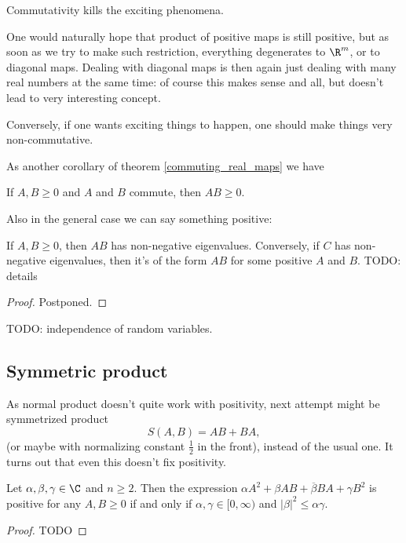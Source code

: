 \begin{phil}
	Commutativity kills the exciting phenomena.
\end{phil}

One would naturally hope that product of positive maps is still positive, but as soon as we try to make such restriction, everything degenerates to $\R^{m}$, or to diagonal maps. Dealing with diagonal maps is then again just dealing with many real numbers at the same time: of course this makes sense and all, but doesn't lead to very interesting concept.

Conversely, if one wants exciting things to happen, one should make things very non-commutative.

As another corollary of theorem \ref{commuting_real_maps} we have

\begin{kor}
	If $A, B \geq 0$ and $A$ and $B$ commute, then $AB \geq 0$.
\end{kor}

Also in the general case we can say something positive:

\begin{prop}
	If $A, B \geq 0$, then $AB$ has non-negative eigenvalues. Conversely, if $C$ has non-negative eigenvalues, then it's of the form $AB$ for some positive $A$ and $B$. TODO: details
\end{prop}
\begin{proof}
	Postponed.
\end{proof}

TODO: independence of random variables.

\subsection{Symmetric product}

As normal product doesn't quite work with positivity, next attempt might be symmetrized product
\[
	S(A, B) = AB + BA,
\]
(or maybe with normalizing constant $\frac{1}{2}$ in the front), instead of the usual one. It turns out that even this doesn't fix positivity.

\begin{prop}\label{symmetric_fail}
	Let $\alpha, \beta, \gamma \in \C$ and $n \geq 2$. Then the expression $\alpha A^{2} + \beta AB + \overline{\beta} BA + \gamma B^{2}$ is positive for any $A, B \geq 0$ if and only if $\alpha, \gamma \in [0, \infty)$ and $|\beta|^{2} \leq \alpha \gamma$.
\end{prop}
\begin{proof}
	TODO
\end{proof}

